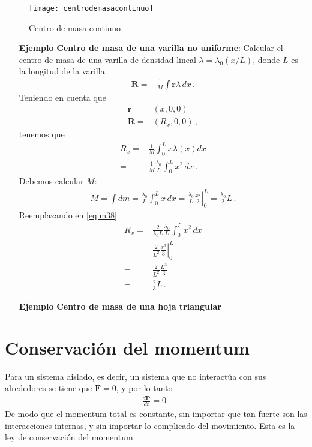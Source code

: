 \begin{frame}
  \begin{figure}
  \centering
  \texttt{[image: centrodemasacontinuo]}
  \caption{Centro de masa continuo}
  \label{fig:centrodemasacontinuo}
\end{figure}
\end{frame}

\begin{itemize}
\item[\textbf{Ejemplo}] \textbf{Centro de masa de una varilla no uniforme}: Calcular el centro de masa de una varilla de densidad lineal $\lambda=\lambda_0(x/L)$, donde $L$ es la longitud de la varilla
  \begin{align}
    \mathbf{R}=&\frac{1}{M}\int \mathbf{r}\lambda\,dx\,.
  \end{align}
Teniendo en cuenta que
\begin{align}
  \mathbf{r}=&(x,0,0)\nonumber\\
  \mathbf{R}=&(R_x,0,0)\,,
\end{align}
tenemos que
\begin{align}
  \label{eq:m38}
  R_x=&\frac{1}{M}\int_0^L x\lambda(x)dx\nonumber\\
  =&\frac{1}{M}\frac{\lambda_0}{L}\int_0^L x^2\,dx\,.
\end{align}
Debemos calcular $M$:
\begin{align}
  M=\int dm=\frac{\lambda_0}{L}\int_0^L x\,dx=\frac{\lambda_0}{L}
  \left.\frac{x^2}{2}  \right|_0^L=\frac{\lambda_0}{2}L\,.
\end{align}
Reemplazando en \eqref{eq:m38}
\begin{align}
  R_x=&\frac{2}{\lambda_0L}\frac{\lambda_0}{L}\int_0^L x^2\,dx\nonumber\\
  =&\frac{2}{L^2}\left.\frac{x^3}{3}  \right|_0^L\nonumber\\
  =&\frac{2}{L^2}\frac{L^3}{3}\nonumber\\
  =&\frac{2}{3}L\,.
\end{align}

\item[\textbf{Ejemplo}] \textbf{Centro de masa de una hoja triangular} 
\end{itemize}

\section{Conservación del momentum}
Para un sistema aislado, es decir, un sistema que no interactúa con sus alrededores se tiene que $\mathbf{F}=0$, y por lo tanto
\begin{align}
  \frac{d\mathbf{P}}{dt}=0\,.
\end{align}
De modo que el momentum total es constante, sin importar que tan fuerte son las interacciones internas, y sin importar lo complicado del movimiento. Esta es la ley de conservación del momentum.

